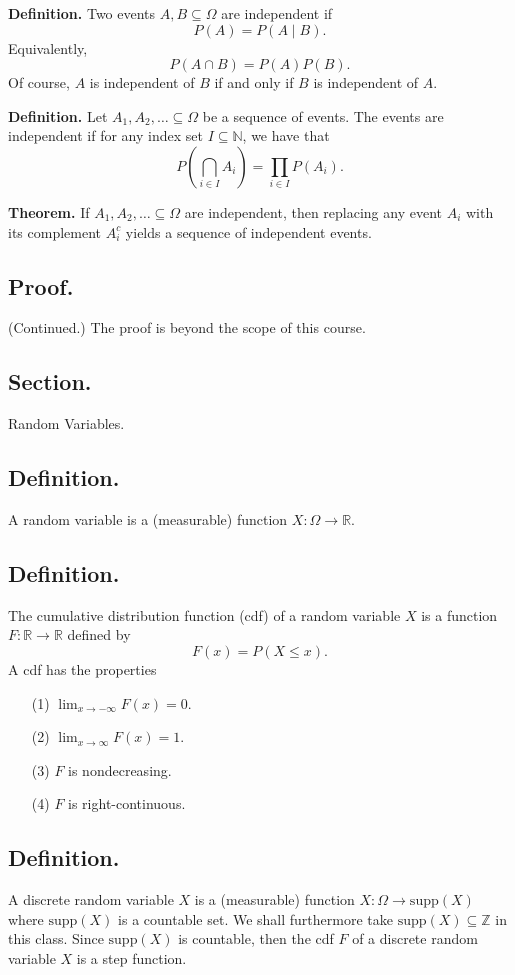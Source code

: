 \documentclass[titlepage]{article}
\begin{document}
\textbf{Definition.} Two events $A, B \subseteq \Omega$ are independent if 
$$P(A) = P(A \mid B).$$
Equivalently, 
$$P(A \cap B) = P(A)P(B).$$ Of course, $A$ is independent of $B$ if and only if $B$ is independent of $A$.

\textbf{Definition.} Let $A_{1}, A_{2}, \ldots \subseteq \Omega$ be a sequence of events. The events are independent if for any index set $I \subseteq \mathbb{N}$, we have that
$$P\left(\bigcap_{i \in I}A_{i}\right) = \prod_{i \in I}P(A_{i}).$$

\textbf{Theorem.} If $A_{1}, A_{2}, \ldots \subseteq \Omega$ are independent, then replacing any event $A_{i}$ with its complement $A_{i}^{c}$ yields a sequence of independent events.

\subsection{Proof.} (Continued.) The proof is beyond the scope of this course.

\newpage {}

\subsection{Section.} Random Variables.

\subsection{Definition.} A random variable is a (measurable) function $X: \Omega \to \mathbb{R}$.

\subsection{Definition.} The cumulative distribution function (cdf) of a random variable $X$ is a function $F: \mathbb{R} \to \mathbb{R}$ defined by
$$F(x) = P(X \leq x).$$
A cdf has the properties 
\begin{enumerate}
\item[(1)] $\lim_{x \to -\infty}F(x) = 0$.
\item[(2)] $\lim_{x \to \infty}F(x) = 1$.
\item[(3)] $F$ is nondecreasing.
\item[(4)] $F$ is right-continuous.
\end{enumerate}

\subsection{Definition.} A discrete random variable $X$ is a (measurable) function $X: \Omega \to \text{supp}(X)$ where $\text{supp}(X)$ is a countable set. We shall furthermore take $\text{supp}(X) \subseteq \mathbb{Z}$ in this class. Since $\text{supp}(X)$ is countable, then the cdf $F$ of a discrete random variable $X$ is a step function.
\end{document}
